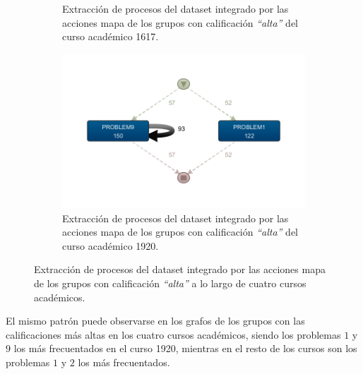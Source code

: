 \begin{figure}[H]
\begin{subfigure}[t]{0.60\textwidth}
    \caption{Extracción de procesos del dataset integrado por las acciones mapa de los grupos con calificación \emph{``alta''} del curso académico 1617.}
    \label{fig:mapYear1617HighGrades}
  \end{subfigure}
  \hfill
  \begin{subfigure}[t]{0.60\textwidth}
    \includegraphics[width=1.10\textwidth, height=0.80\textwidth]{imagenes/DISCO_map/Dataset FusionadoYear1920HighGrades.png}
    \caption{Extracción de procesos del dataset integrado por las acciones mapa de los grupos con calificación \emph{``alta''} del curso académico 1920.}
    \label{fig:mapYear1920HighGrades}
  \end{subfigure}
  \caption{Extracción de procesos del dataset integrado por las acciones mapa de los grupos con calificación \emph{``alta''} a lo largo de cuatro cursos académicos.}
\end{figure}

El mismo patrón puede observarse en los grafos de los grupos con las calificaciones más altas en los cuatro cursos académicos, siendo los problemas $1$ y $9$ los más frecuentados en el curso 1920, mientras en el resto de los cursos son los problemas $1$ y $2$ los más frecuentados.

